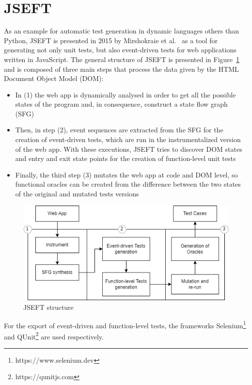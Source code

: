 \documentclass[%
  chapterprefix=false,%
  open=right,%
  twoside=true,%
  paper=a4,%
  logofile={Figures/logo.png},%
  thesistype=master,%
  UKenglish,%
]{se2thesis}
\begin{document}
\section{JSEFT}

As an example for automatic test generation in dynamic languages others than Python, JSEFT is presented in 2015 by Mirshokraie et al.~\cite{DBLP:conf/icst/Mirshokraie0P15} as a tool for generating not only unit tests, but also event-driven tests for web applications written in JavaScript.
The general structure of JSEFT is presented in Figure~\ref{fig:jseft} and is composed of three main steps that process the data given by the HTML Document Object Model (DOM):
\begin{itemize}
  \item In (1) the web app is dynamically analysed in order to get all the possible states of the program and, in consequence, construct a state flow graph (SFG)
  \item Then, in step (2), event sequences are extracted from the SFG for the creation of event-driven tests, which are run in the instrumentalized version of the web app.
  With these executions, JSEFT tries to discover DOM states and entry and exit state points for the creation of function-level unit tests
  \item Finally, the third step (3) mutates the web app at code and DOM level, so functional oracles can be created from the difference between the two states of the original and mutated tests versions
\end{itemize}

\begin{figure}[tb]
  \centering 
  \includegraphics[width=.99\textwidth]{Figures/jseft2.png}
  \caption{JSEFT structure}\label{fig:jseft}
\end{figure}

For the export of event-driven and function-level tests, the frameworks Selenium\footnote{https://www.selenium.dev} and QUnit\footnote{https://qunitjs.com} are used respectively.
\end{document}
